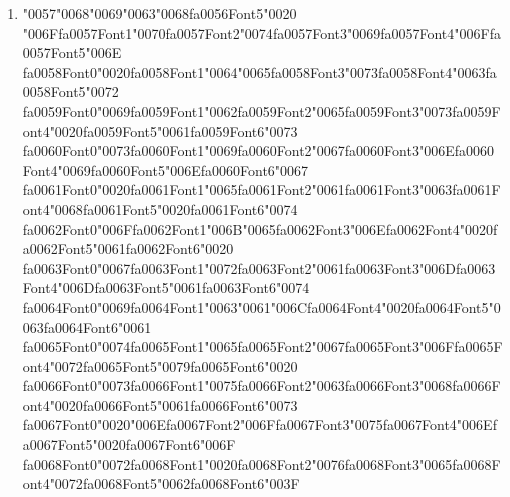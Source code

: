 \documentclass[11pt]{article}
\begin{document}
\begin{enumerate}[leftmargin=*]
  \item {\char"0057}{\char"0068}{\char"0069}{\char"0063}{\char"0068}{\csname fa0056Font5\endcsname\char"0020} {\char"006F}{\csname fa0057Font1\endcsname\char"0070}{\csname fa0057Font2\endcsname\char"0074}{\csname fa0057Font3\endcsname\char"0069}{\csname fa0057Font4\endcsname\char"006F}{\csname fa0057Font5\endcsname\char"006E} {\csname fa0058Font0\endcsname\char"0020}{\csname fa0058Font1\endcsname\char"0064}{\char"0065}{\csname fa0058Font3\endcsname\char"0073}{\csname fa0058Font4\endcsname\char"0063}{\csname fa0058Font5\endcsname\char"0072} {\csname fa0059Font0\endcsname\char"0069}{\csname fa0059Font1\endcsname\char"0062}{\csname fa0059Font2\endcsname\char"0065}{\csname fa0059Font3\endcsname\char"0073}{\csname fa0059Font4\endcsname\char"0020}{\csname fa0059Font5\endcsname\char"0061}{\csname fa0059Font6\endcsname\char"0073} {\csname fa0060Font0\endcsname\char"0073}{\csname fa0060Font1\endcsname\char"0069}{\csname fa0060Font2\endcsname\char"0067}{\csname fa0060Font3\endcsname\char"006E}{\csname fa0060Font4\endcsname\char"0069}{\csname fa0060Font5\endcsname\char"006E}{\csname fa0060Font6\endcsname\char"0067} {\csname fa0061Font0\endcsname\char"0020}{\csname fa0061Font1\endcsname\char"0065}{\csname fa0061Font2\endcsname\char"0061}{\csname fa0061Font3\endcsname\char"0063}{\csname fa0061Font4\endcsname\char"0068}{\csname fa0061Font5\endcsname\char"0020}{\csname fa0061Font6\endcsname\char"0074} {\csname fa0062Font0\endcsname\char"006F}{\csname fa0062Font1\endcsname\char"006B}{\char"0065}{\csname fa0062Font3\endcsname\char"006E}{\csname fa0062Font4\endcsname\char"0020}{\csname fa0062Font5\endcsname\char"0061}{\csname fa0062Font6\endcsname\char"0020} {\csname fa0063Font0\endcsname\char"0067}{\csname fa0063Font1\endcsname\char"0072}{\csname fa0063Font2\endcsname\char"0061}{\csname fa0063Font3\endcsname\char"006D}{\csname fa0063Font4\endcsname\char"006D}{\csname fa0063Font5\endcsname\char"0061}{\csname fa0063Font6\endcsname\char"0074} {\csname fa0064Font0\endcsname\char"0069}{\csname fa0064Font1\endcsname\char"0063}{\char"0061}{\char"006C}{\csname fa0064Font4\endcsname\char"0020}{\csname fa0064Font5\endcsname\char"0063}{\csname fa0064Font6\endcsname\char"0061} {\csname fa0065Font0\endcsname\char"0074}{\csname fa0065Font1\endcsname\char"0065}{\csname fa0065Font2\endcsname\char"0067}{\csname fa0065Font3\endcsname\char"006F}{\csname fa0065Font4\endcsname\char"0072}{\csname fa0065Font5\endcsname\char"0079}{\csname fa0065Font6\endcsname\char"0020} {\csname fa0066Font0\endcsname\char"0073}{\csname fa0066Font1\endcsname\char"0075}{\csname fa0066Font2\endcsname\char"0063}{\csname fa0066Font3\endcsname\char"0068}{\csname fa0066Font4\endcsname\char"0020}{\csname fa0066Font5\endcsname\char"0061}{\csname fa0066Font6\endcsname\char"0073} {\csname fa0067Font0\endcsname\char"0020}{\char"006E}{\csname fa0067Font2\endcsname\char"006F}{\csname fa0067Font3\endcsname\char"0075}{\csname fa0067Font4\endcsname\char"006E}{\csname fa0067Font5\endcsname\char"0020}{\csname fa0067Font6\endcsname\char"006F} {\csname fa0068Font0\endcsname\char"0072}{\csname fa0068Font1\endcsname\char"0020}{\csname fa0068Font2\endcsname\char"0076}{\csname fa0068Font3\endcsname\char"0065}{\csname fa0068Font4\endcsname\char"0072}{\csname fa0068Font5\endcsname\char"0062}{\csname fa0068Font6\endcsname\char"003F}

\end{enumerate}
\end{document}
